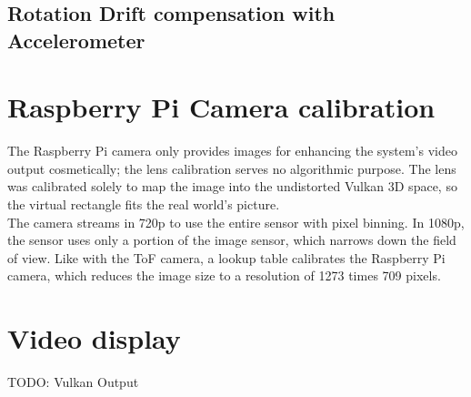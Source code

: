 \subsection{Rotation Drift compensation with Accelerometer}
\label{sec:RotDriftCompensation}

\section{Raspberry Pi Camera calibration}
\label{sec:RBPiCalibration}
The Raspberry Pi camera only provides images for enhancing the system's video output cosmetically; the lens calibration serves no algorithmic purpose. The lens was calibrated solely to map the image into the undistorted Vulkan 3D space, so the virtual rectangle fits the real world's picture.\\
The camera streams in 720p to use the entire sensor with pixel binning. In 1080p, the sensor uses only a portion of the image sensor, which narrows down the field of view. Like with the ToF camera, a lookup table calibrates the Raspberry Pi camera, which reduces the image size to a resolution of 1273 times 709 pixels.
\section{Video display}
\label{sec:VideoDisplay}
TODO: Vulkan Output